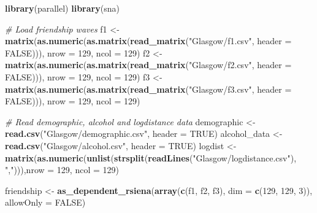 \documentclass[
]{article}
\newenvironment{Shaded}{\begin{snugshade}}{\end{snugshade}}
\newcommand{\AttributeTok}[1]{\textcolor[rgb]{0.13,0.29,0.53}{#1}}
\newcommand{\CommentTok}[1]{\textcolor[rgb]{0.56,0.35,0.01}{\textit{#1}}}
\newcommand{\ConstantTok}[1]{\textcolor[rgb]{0.56,0.35,0.01}{#1}}
\newcommand{\DecValTok}[1]{\textcolor[rgb]{0.00,0.00,0.81}{#1}}
\newcommand{\FunctionTok}[1]{\textcolor[rgb]{0.13,0.29,0.53}{\textbf{#1}}}
\newcommand{\NormalTok}[1]{#1}
\newcommand{\OtherTok}[1]{\textcolor[rgb]{0.56,0.35,0.01}{#1}}
\newcommand{\StringTok}[1]{\textcolor[rgb]{0.31,0.60,0.02}{#1}}
\begin{document}
\begin{Shaded}
\begin{Highlighting}[]
\FunctionTok{library}\NormalTok{(parallel)}
\FunctionTok{library}\NormalTok{(sna)}

\CommentTok{\# Load friendship waves}
\NormalTok{f1 }\OtherTok{\textless{}{-}} \FunctionTok{matrix}\NormalTok{(}\FunctionTok{as.numeric}\NormalTok{(}\FunctionTok{as.matrix}\NormalTok{(}\FunctionTok{read\_matrix}\NormalTok{(}\StringTok{"Glasgow/f1.csv"}\NormalTok{, }\AttributeTok{header =} \ConstantTok{FALSE}\NormalTok{))), }
             \AttributeTok{nrow =} \DecValTok{129}\NormalTok{, }\AttributeTok{ncol =} \DecValTok{129}\NormalTok{)}
\NormalTok{f2 }\OtherTok{\textless{}{-}} \FunctionTok{matrix}\NormalTok{(}\FunctionTok{as.numeric}\NormalTok{(}\FunctionTok{as.matrix}\NormalTok{(}\FunctionTok{read\_matrix}\NormalTok{(}\StringTok{"Glasgow/f2.csv"}\NormalTok{, }\AttributeTok{header =} \ConstantTok{FALSE}\NormalTok{))), }
             \AttributeTok{nrow =} \DecValTok{129}\NormalTok{, }\AttributeTok{ncol =} \DecValTok{129}\NormalTok{)}
\NormalTok{f3 }\OtherTok{\textless{}{-}} \FunctionTok{matrix}\NormalTok{(}\FunctionTok{as.numeric}\NormalTok{(}\FunctionTok{as.matrix}\NormalTok{(}\FunctionTok{read\_matrix}\NormalTok{(}\StringTok{"Glasgow/f3.csv"}\NormalTok{, }\AttributeTok{header =} \ConstantTok{FALSE}\NormalTok{))), }
             \AttributeTok{nrow =} \DecValTok{129}\NormalTok{, }\AttributeTok{ncol =} \DecValTok{129}\NormalTok{)}

\CommentTok{\# Read demographic, alcohol and logdistance data}
\NormalTok{demographic }\OtherTok{\textless{}{-}} \FunctionTok{read.csv}\NormalTok{(}\StringTok{"Glasgow/demographic.csv"}\NormalTok{, }\AttributeTok{header =} \ConstantTok{TRUE}\NormalTok{)}
\NormalTok{alcohol\_data }\OtherTok{\textless{}{-}} \FunctionTok{read.csv}\NormalTok{(}\StringTok{"Glasgow/alcohol.csv"}\NormalTok{, }\AttributeTok{header =} \ConstantTok{TRUE}\NormalTok{)}
\NormalTok{logdist }\OtherTok{\textless{}{-}} \FunctionTok{matrix}\NormalTok{(}\FunctionTok{as.numeric}\NormalTok{(}\FunctionTok{unlist}\NormalTok{(}\FunctionTok{strsplit}\NormalTok{(}\FunctionTok{readLines}\NormalTok{(}\StringTok{"Glasgow/logdistance.csv"}\NormalTok{), }\StringTok{","}\NormalTok{))),}\AttributeTok{nrow =} \DecValTok{129}\NormalTok{, }\AttributeTok{ncol =} \DecValTok{129}\NormalTok{)}


\NormalTok{friendship }\OtherTok{\textless{}{-}} \FunctionTok{as\_dependent\_rsiena}\NormalTok{(}\FunctionTok{array}\NormalTok{(}\FunctionTok{c}\NormalTok{(f1, f2, f3), }\AttributeTok{dim =} \FunctionTok{c}\NormalTok{(}\DecValTok{129}\NormalTok{, }\DecValTok{129}\NormalTok{, }\DecValTok{3}\NormalTok{)), }\AttributeTok{allowOnly =} \ConstantTok{FALSE}\NormalTok{)}


\end{Highlighting}
\end{Shaded}
\end{document}
